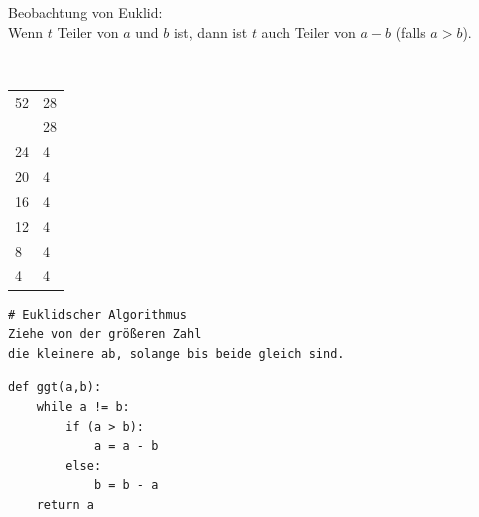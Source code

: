 \documentclass[10pt]{beamer}
\begin{document}
\begin{frame}[fragile]
\begin{minipage}[c]{8cm}
Beobachtung von Euklid: \\
Wenn $t$ Teiler von $a$ und $b$ ist, dann ist $t$ auch Teiler von $a-b$ (falls $a>b$).
\end{minipage} ~~
\begin{minipage}[c]{3cm}       \pause
\begin{tabular}{ll}
52  & 28 \\ \pause
24  & 28 \\ 
24  & 4 \\ 
20  & 4 \\ 
16 & 4 \\ 
12 & 4 \\ 
8 & 4 \\ 
4 & 4 \\ 
\end{tabular}
\end{minipage}

\begin{lstlisting} 
# Euklidscher Algorithmus
Ziehe von der größeren Zahl 
die kleinere ab, solange bis beide gleich sind.
\end{lstlisting}   \pause

\begin{lstlisting} 
def ggt(a,b):
    while a != b:
        if (a > b):
            a = a - b
        else:  
            b = b - a
    return a
\end{lstlisting}  
\end{frame}
\end{document}
